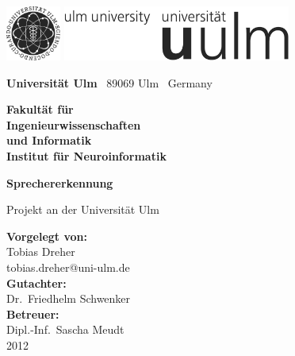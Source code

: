\documentclass[a4paper,10pt,bibliography=totoc,oneside,openright,numbers=noenddot,headings=normal,DIV=9
]{scrreprt}
\makeatletter
\newcommand{\fullname}{Tobias Dreher}
\newcommand{\email}{tobias.dreher@uni-ulm.de}
\newcommand{\titel}{Sprechererkennung}
\newcommand{\jahr}{2012}
\newcommand{\gutachterA}{Dr.\ Friedhelm Schwenker}
\newcommand{\betreuer}{Dipl.-Inf.\ Sascha Meudt}
\newcommand{\fakultaet}{Ingenieurwissenschaften\\und Informatik}
\newcommand{\institut}{Institut für Neuroinformatik}
\makeatother
\begin{document}

\thispagestyle{empty}
\vspace*{1.0em}

\includegraphics[height=1.8cm]{images/unilogo_bild}
\hfill
\includegraphics[height=1.8cm]{images/unilogo_wort}
\vspace*{2.1em}

{\footnotesize
{\bfseries Universität Ulm} \textbar ~89069 Ulm \textbar ~Germany
\hfill\parbox[t]{42mm}{\bfseries Fakultät für\\
\fakultaet\\
\mdseries \institut}
\vspace*{2cm}

\parbox{140mm}{\bfseries \huge \titel}

{\footnotesize Projekt an der Universität Ulm}
\vspace*{4em}

{\footnotesize
{\bfseries Vorgelegt von:}\\
\fullname\\\email\\[2em]
{\bfseries Gutachter:}\\
\gutachterA\\
[2em] %
{\bfseries Betreuer:}\\
\betreuer
\\[1.5em]
\jahr}
}



\tableofcontents







\appendix
%

\end{document}
